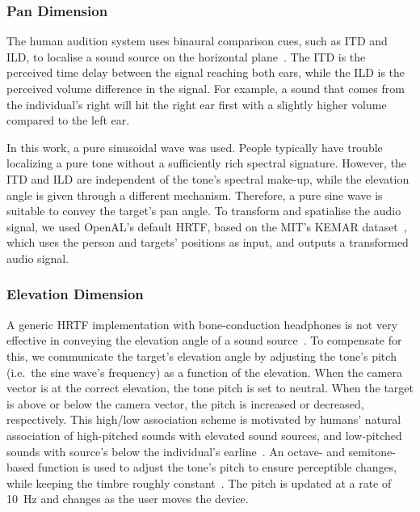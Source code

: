 \documentclass[acmsmall]{acmart}
\begin{document}
\subsubsection{Pan Dimension}

The human audition system uses binaural comparison cues, such as ITD and ILD, to localise a sound source on the horizontal plane~\citep{blauert1969sound}.
The ITD is the perceived time delay between the signal reaching both ears, while the ILD is the perceived volume difference in the signal.
For example, a sound that comes from the individual's right will hit the right ear first with a slightly higher volume compared to the left ear.

In this work, a pure sinusoidal wave was used. 
People typically have trouble localizing a pure tone without a sufficiently rich spectral signature.
However, the ITD and ILD are independent of the tone's spectral make-up, while the elevation angle is given through a different mechanism.
Therefore, a pure sine wave is suitable to convey the target's pan angle.
To transform and spatialise the audio signal, we used OpenAL's default HRTF, based on the MIT's KEMAR dataset~\citep{hiebert2005openal}, which uses the person and targets' positions as input, and outputs a transformed audio signal.

\subsubsection{Elevation Dimension}

A generic HRTF implementation with bone-conduction headphones is not very effective in conveying the elevation angle of a sound source~\citep{macdonald2006spatial,schonstein2008comparison}.
To compensate for this, we communicate the target's elevation angle by adjusting the tone's pitch (i.e.\ the sine wave's frequency) as a function of the elevation. 
When the camera vector is at the correct elevation, the tone pitch is set to neutral.
When the target is above or below the camera vector, the pitch is increased or decreased, respectively.
This high/low association scheme is motivated by humans' natural association of high-pitched sounds with elevated sound sources, and low-pitched sounds with source's below the individual's earline~\citep{pratt1930spatial,blauert1997spatial}.
An octave- and semitone-based function is used to adjust the tone's pitch to ensure perceptible changes, while keeping the timbre roughly constant~\citep{shepard1964circularity}.
The pitch is updated at a rate of \SI{10}{\hertz} and changes as the user moves the device.
\end{document}
